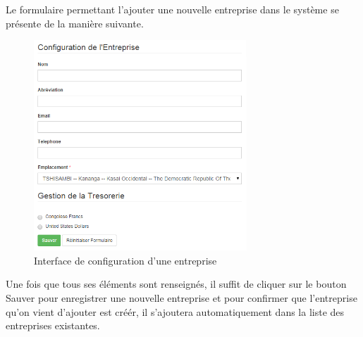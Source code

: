 \documentclass[12pt,a4paper]{report}
\begin{document}
Le formulaire permettant l'ajouter une nouvelle entreprise dans le système se présente de la manière suivante.
\begin{figure}[h]
\begin{center}
\includegraphics[width=8cm]{pic/Config_entreprise.png}
\end{center}
\caption{Interface de configuration d'une entreprise}
\label{Interface principale de la gestion des utilisateurs}
\end{figure} 

Une fois que tous ses éléments sont renseignés, il suffit de cliquer sur le bouton Sauver pour enregistrer une nouvelle entreprise et pour confirmer que l'entreprise qu'on vient d'ajouter est créér, il s'ajoutera automatiquement dans la liste des entreprises existantes. 
\end{document}
